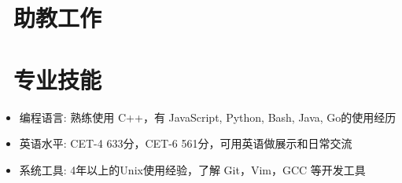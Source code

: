 \documentclass{resume}
\begin{document}
\section{\faBook\ 助教工作}

\section{\faCogs\ 专业技能}
\begin{itemize}[parsep=1.0ex]
  \item 编程语言: 熟练使用 C++，有 JavaScript, Python, Bash, Java, Go的使用经历
  \item 英语水平: CET-4 633分，CET-6 561分，可用英语做展示和日常交流
  \item 系统工具: 4年以上的Unix使用经验，了解 Git，Vim，GCC 等开发工具
\end{itemize}
\end{document}
